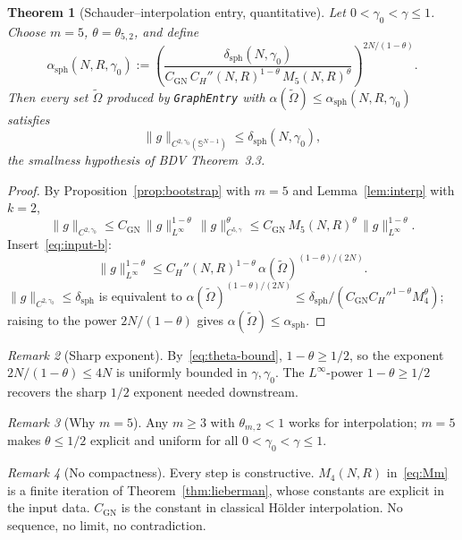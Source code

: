 \documentclass[11pt,a4paper]{article}
\newtheorem{theorem}{Theorem}[section]
\theoremstyle{definition}
\theoremstyle{remark}
\newtheorem{remark}[theorem]{Remark}
\newcommand{\Om}{\widetilde{\Omega}}
\newcommand{\Sph}{\mathbb{S}^{N-1}}
\newcommand{\norm}[1]{\lVert#1\rVert}
\newcommand{\sph}{\mathrm{sph}}
\begin{document}
\begin{theorem}[Schauder--interpolation entry, quantitative]\label{thm:sph-entry}
Let $0<\gamma_{0}<\gamma\le1$. Choose $m=5$, $\theta=\theta_{5,2}$, and
define
\begin{equation}\label{eq:alpha-sph}
   \boxed{\;
   \alpha_{\sph}(N,R,\gamma_{0})
      :=\left(
              \frac{\delta_{\sph}(N,\gamma_{0})}
                   {C_{\mathrm{GN}}\,C_{H}''(N,R)^{1-\theta}\,
                    M_{5}(N,R)^{\theta}}
            \right)^{\!2N/(1-\theta)}.\;}
\end{equation}
Then every set $\Om$ produced by \texttt{GraphEntry} with
$\alpha(\Om)\le\alpha_{\sph}(N,R,\gamma_{0})$ satisfies
\begin{equation}\label{eq:smallC2}
   \norm{g}_{C^{2,\gamma_{0}}(\Sph)}\le\delta_{\sph}(N,\gamma_{0}),
\end{equation}
the smallness hypothesis of BDV Theorem~3.3.
\end{theorem}

\begin{proof}
By Proposition~\ref{prop:bootstrap} with $m=5$ and
Lemma~\ref{lem:interp} with $k=2$,
\[
   \norm{g}_{C^{2,\gamma_{0}}}
      \le C_{\mathrm{GN}}\,\norm{g}_{L^{\infty}}^{1-\theta}\,
           \norm{g}_{C^{5,\gamma}}^{\theta}
      \le C_{\mathrm{GN}}\,M_{5}(N,R)^{\theta}\,
           \norm{g}_{L^{\infty}}^{1-\theta}.
\]
Insert~\eqref{eq:input-b}:
\[
   \norm{g}_{L^{\infty}}^{1-\theta}
      \le C_{H}''(N,R)^{1-\theta}\,\alpha(\Om)^{(1-\theta)/(2N)}.
\]
$\norm{g}_{C^{2,\gamma_{0}}}\le\delta_{\sph}$ is equivalent to
$\alpha(\Om)^{(1-\theta)/(2N)}\le
\delta_{\sph}/(C_{\mathrm{GN}}C_{H}''^{1-\theta}M_{4}^{\theta})$;
raising to the power $2N/(1-\theta)$ gives $\alpha(\Om)\le\alpha_{\sph}$.
\end{proof}

\begin{remark}[Sharp exponent]
By~\eqref{eq:theta-bound}, $1-\theta\ge1/2$, so the exponent
$2N/(1-\theta)\le 4N$ is uniformly bounded in $\gamma,\gamma_{0}$. The
$L^{\infty}$-power $1-\theta\ge1/2$ recovers the sharp $1/2$ exponent
needed downstream.
\end{remark}

\begin{remark}[Why $m=5$]
Any $m\ge 3$ with $\theta_{m,2}<1$ works for interpolation; $m=5$ makes
$\theta\le1/2$ explicit and uniform for all $0<\gamma_0<\gamma\le1$.
\end{remark}

\begin{remark}[No compactness]
Every step is constructive. $M_{4}(N,R)$ in~\eqref{eq:Mm} is a finite
iteration of Theorem~\ref{thm:lieberman}, whose constants are explicit
in the input data. $C_{\mathrm{GN}}$ is the constant in classical Hölder
interpolation. No sequence, no limit, no contradiction.
\end{remark}
\end{document}
